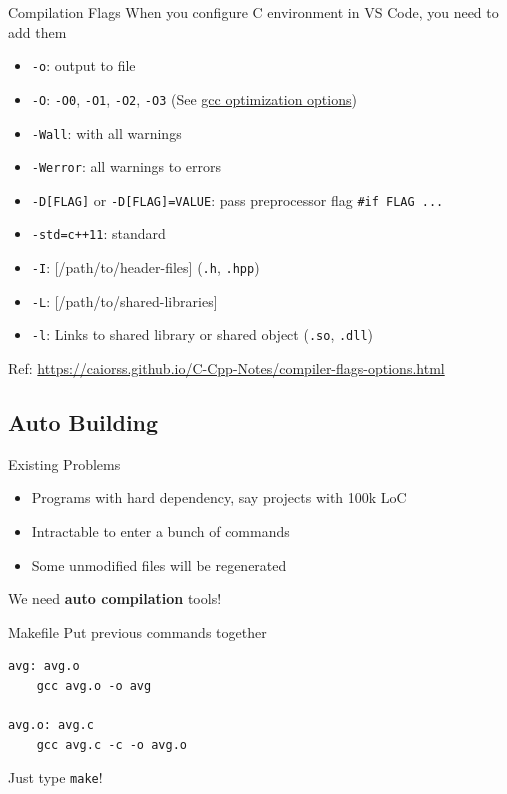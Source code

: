 \documentclass{../TexTemplate/myslide}
\begin{document}
\begin{frame}[fragile]{Compilation Flags}
When you configure C environment in VS Code, you need to add them
\begin{itemize}
	\item \verb'-o': output to file
	\item \verb'-O': \verb'-O0', \verb'-O1', \verb'-O2', \verb'-O3' (See \href{https://gcc.gnu.org/onlinedocs/gcc/Optimize-Options.html}{gcc optimization options})
	\item \verb'-Wall': with all warnings
	\item \verb'-Werror': all warnings to errors
	\item \verb'-D[FLAG]' or \verb'-D[FLAG]=VALUE': pass preprocessor flag \verb'#if FLAG ...'
	\item \verb'-std=c++11': standard
	\item \verb'-I': [/path/to/header-files] (\verb'.h', \verb'.hpp')
	\item \verb'-L': [/path/to/shared-libraries]
	\item \verb'-l': Links to shared library or shared object (\verb'.so', \verb'.dll')
\end{itemize}
\scriptsize Ref: \url{https://caiorss.github.io/C-Cpp-Notes/compiler-flags-options.html}
\end{frame}

\subsection{Auto Building}
\begin{frame}
\subsectionpage
\end{frame}

\begin{frame}{Existing Problems}
\begin{itemize}
\item Programs with hard dependency, say projects with 100k LoC
\item Intractable to enter a bunch of commands
\item Some unmodified files will be regenerated
\end{itemize}
\pause
\begin{center}
\large We need \textbf{auto compilation} tools!
\end{center}
\end{frame}

\begin{frame}[fragile]{Makefile}
Put previous commands together
\begin{verbatim}
avg: avg.o
	gcc avg.o -o avg

avg.o: avg.c
	gcc avg.c -c -o avg.o
\end{verbatim}
Just type \verb'make'!
\end{frame}
\end{document}

